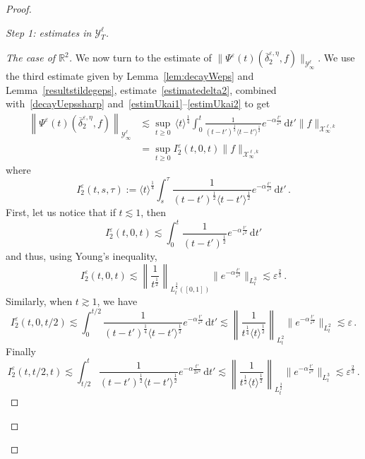 \documentclass[11pt]{article}
\theoremstyle{definition}
\numberwithin{equation}{section}
\numberwithin{figure}{section}
\numberwithin{table}{section}
\newcommand*{\dd}{\mathrm{d}}
\newcommand*{\dt}{\dd t}
\newenvironment{step}[1]{\begin{proof}[#1]}{\let\qed\relax\end{proof}}
\newcommand*\R {\mathbb{R}}
\newcommand*\eps{{\varepsilon}}
\begin{document}
\begin{proof}
\begin{step}{Step 1: estimates in $\mathcal{Y}^\ell_T$}
\begin{step}{The case of $\R^2$}
We now turn to the estimate of $\|\Psi^\eps(t) (\overline \delta^{\eps,\eta}_2, f)\|_{\mathcal{Y}^\ell_\infty}$. We use the third estimate given by Lemma~\ref{lem:decayWeps} and Lemma~\ref{resultstildegeps}, estimate~\eqref{estimatedelta2}, combined with~\eqref{decayUepssharp} and~\eqref{estimUkai1}--\eqref{estimUkai2} to get
\begin{align*}
\left\|\Psi^\eps(t) (\overline \delta^{\eps,\eta}_2, f)\right\|_{\mathcal{Y}^\ell_\infty} &\lesssim \sup_{t \ge 0} \, \langle t \rangle^\frac{1}{4} \int_0^t \frac{1}{{(t-t')^\frac{1}{2} \langle t-t'\rangle^\frac{1}{2}}} e^{- \alpha \frac{t'}{\eps^2}} \, \dt' \|f\|_{\mathcal{X}^{\ell,k}_\infty}\\&= \sup_{t \ge 0} I_2^\eps(t,0,t) \|f\|_{\mathcal{X}^{\ell,k}_\infty}
\end{align*}
where
\[
I_2^\eps(t,s,\tau) := \langle t \rangle^\frac{1}{4} \int_s^\tau \frac{1}{{(t-t')^\frac{1}{2} \langle t-t'\rangle^\frac{1}{2}}} e^{- \alpha \frac{t'}{\eps^2}} \, \dt' \,.
\]
First, let us notice that if $t \lesssim 1$, then
\[
I_2^\eps(t,0,t) \lesssim \int_0^t \frac{1}{(t-t')^\frac{1}{2}} e^{- \alpha \frac{t'}{\eps^2}} \, \dt'
\]
and thus, using Young's inequality,
\[
I_2^\eps(t,0,t) \lesssim \left\| \frac{1}{t^{\frac12}}\right\|_{L^{\frac32}_t([0,1])}\Big\|e^{- \alpha \frac{t'}{\eps^2}}\Big\|_{L^3_t} \lesssim \eps^{\frac23} \,.
\]
Similarly, when $t \gtrsim 1$, we have
\[
I_2^\eps(t,0,t/2) \lesssim \int_0^{t/2} \frac{1}{{(t-t')^\frac{1}{4} \langle t-t'\rangle^\frac{1}{2}}} e^{-\alpha \frac{t'}{\eps^2}} \, \dt'
\lesssim \left\| \frac{1}{{t^{\frac14} \langle t \rangle^{\frac12}}}\right\|_{L^{2}_t}\Big\|e^{- \alpha \frac{t'}{\eps^2}}\Big\|_{L^2_t} \lesssim \eps \,.
\]
Finally
\[
I_2^\eps(t,t/2,t) \lesssim \int_{t/2}^t \frac{1}{{(t-t')^\frac{1}{2} \langle t-t'\rangle^\frac{1}{2}}} e^{-\alpha \frac{t'}{{2\eps^2}}} \, \dt'
\lesssim \left\| \frac{1}{{t^{\frac12} \langle t \rangle^{\frac12}}}\right\|_{L^{\frac32}_t}\Big\|e^{-\alpha \frac{t'}{\eps^2}}\Big\|_{L^3_t} \lesssim \eps^{\frac23} \,.
\]
\end{step}


\end{step}
\end{proof}
\end{document}
